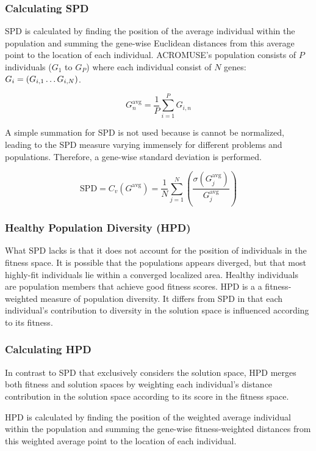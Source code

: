 \documentclass[../main.tex]{subfiles}
\begin{document}
\subsubsection{Calculating SPD}

SPD is calculated by finding the position of the average individual within the population and summing the gene-wise
Euclidean distances from this average point to the location of each individual. ACROMUSE’s population consists of $P$ individuals ($G_1$ to $G_P$) where each individual consist of $N$ genes: $G_i = (G_{i,1} \mathellipsis G_{i,N})$.

\begin{equation}
G_n^{\text{avg}} = \frac{1}{P} \sum_{i=1}^P G_{i,n}
\end{equation}

A simple summation for SPD is not used because is cannot be normalized, leading to the SPD measure varying immensely for different problems and populations. Therefore, a gene-wise standard deviation is performed.

\begin{equation}
\text{SPD} = C_v(G^{\text{avg}}) = \frac{1}{N} \sum_{j=1}^N \left( \frac{\sigma (G^{\text{avg}}_j)}{G^{\text{avg}}_j} \right)
\end{equation}

\subsubsection{Healthy Population Diversity (HPD)}
What SPD lacks is that it does not account for the position of individuals in the fitness space. It is possible that
the populations appears diverged, but that most highly-fit individuals lie within a converged localized area. Healthy
individuals are population members that achieve good fitness scores. HPD is a a fitness-weighted measure of population
diversity. It differs from SPD in that each individual's contribution to diversity in the solution space is influenced
according to its fitness.

\subsubsection{Calculating HPD}
In contrast to SPD that exclusively considers the solution space, HPD merges both fitness and solution spaces by
weighting each individual's distance contribution in the solution space according to its score in the fitness space.

HPD is calculated by finding the position of the weighted average individual within the population and summing the
gene-wise fitness-weighted distances from this weighted average point to the location of each individual.
\end{document}
